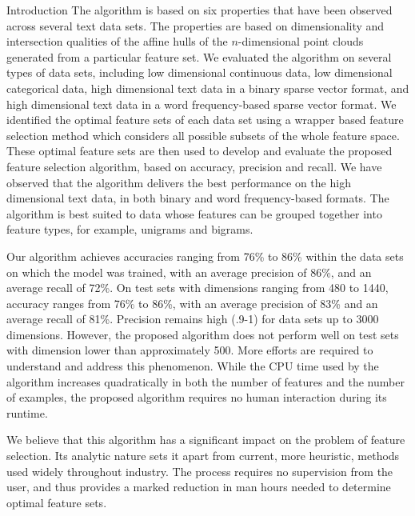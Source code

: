 \documentclass{llncs}
\begin{document}
\begin{section}{Introduction}
The algorithm is based on six properties that have been observed across several text data sets. The properties are based on dimensionality and intersection qualities of the affine hulls of the $n$-dimensional point clouds generated from a particular feature set. We evaluated the algorithm on several types of data sets, including low dimensional continuous data, low dimensional categorical data, high dimensional text data in a binary sparse vector format, and high dimensional text data in a word frequency-based sparse vector format. We identified the optimal feature sets of each data set using a wrapper based feature selection method which considers all possible subsets of the whole feature space. These optimal feature sets are then used to develop and evaluate the proposed feature selection algorithm, based on accuracy, precision and recall. We have observed that the algorithm delivers the  best performance on the high dimensional text data, in both binary and word frequency-based formats. The algorithm is best suited to data whose features can be grouped together into feature types, for example, unigrams and bigrams. 

	
Our algorithm achieves accuracies ranging from 76\% to 86\% within the data sets on which the model was trained, with an average precision of 86\%, and an average recall of 72\%. On test sets with dimensions ranging from 480 to 1440, accuracy ranges from 76\% to 86\%, with an average precision of 83\% and an average recall of 81\%. Precision remains high (.9-1) for data sets up to 3000 dimensions. However, the proposed algorithm does not perform well on test sets with dimension lower than approximately 500. More efforts are required to understand and address this phenomenon. While the CPU time used by the algorithm increases quadratically in both the number of features and the number of examples, the proposed algorithm requires no human interaction during its runtime. 

We believe that this algorithm has a significant impact on the problem of feature selection. Its analytic nature sets it apart from current, more heuristic, methods used widely throughout industry. The process requires no supervision from the user, and thus provides a marked reduction in man hours needed to determine optimal feature sets.
	 
\end{section}
\end{document}
